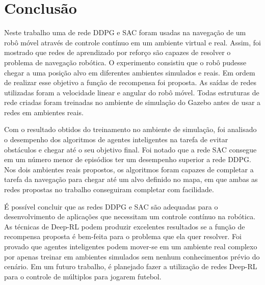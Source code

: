\chapter{Conclusão}

Neste trabalho uma de rede DDPG e SAC foram usadas na navegação de um robô móvel através de controle contínuo em um ambiente virtual e real.
Assim, foi mostrado que redes de aprendizado por reforço são capazes de resolver o problema de navegação robótica.
O experimento consistiu que o robô pudesse chegar a uma posição alvo em diferentes ambientes simulados e reais.
Em ordem de realizar esse objetivo a função de recompensa foi proposta.
As saídas de redes utilizadas foram a velocidade linear e angular do robô móvel.
Todas estruturas de rede criadas foram treinadas no ambiente de simulação do Gazebo antes de usar a redes em ambientes reais.

Com o resultado obtidos do treinamento no ambiente de simulação, foi analisado o desempenho dos algoritmos de agentes inteligentes na tarefa de evitar obstáculos e chegar até o seu objetivo final.
Foi notado que a rede SAC consegue em um número menor de episódios ter um desempenho superior a rede DDPG.
Nos dois ambientes reais propostos, os algoritmos foram capazes de completar a tarefa da navegação para chegar até um alvo definido no mapa, em que ambas as redes propostas no trabalho conseguiram completar com facilidade.

É possível concluir que as redes DDPG e SAC são adequadas para o desenvolvimento de aplicações que necessitam um controle contínuo na robótica. 
As técnicas de  Deep-RL podem produzir excelentes resultados se a função de recompensa proposta é bem-feita para o problema que ela quer resolver.
Foi provado que agentes inteligentes podem mover-se em um ambiente real complexo por apenas treinar em ambientes simulados sem nenhum conhecimentos prévio do cenário.
Em um futuro trabalho, é planejado fazer a utilização de redes Deep-RL para o controle de múltiplos para jogarem futebol.